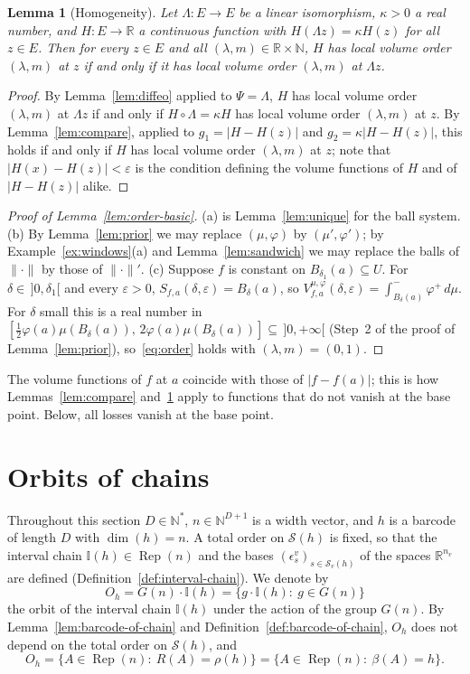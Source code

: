 \documentclass[11pt,a4paper]{article}
\newtheorem{lemma}[theorem]{Lemma}
\theoremstyle{definition}
\theoremstyle{remark}
\numberwithin{equation}{section}
\newcommand{\N}{\mathbb{N}}
\newcommand{\R}{\mathbb{R}}
\newcommand{\Rep}{\operatorname{Rep}}
\newcommand{\norm}[1]{\lVert #1\rVert}
\newcommand{\abs}[1]{\lvert #1\rvert}
\newcommand{\eps}{\varepsilon}
\newcommand{\I}{\mathbb I}
\newcommand{\Sl}{\mathcal S}
\begin{document}
\begin{lemma}[Homogeneity]\label{lem:homog-order}
Let $\Lambda:E\to E$ be a linear isomorphism, $\kappa>0$ a real number, and $H:E\to\R$ a continuous function with $H(\Lambda z)=\kappa H(z)$ for all $z\in E$. Then for every $z\in E$ and all $(\lambda,m)\in\R\times\N$, $H$ has local volume order $(\lambda,m)$ at $z$ if and only if it has local volume order $(\lambda,m)$ at $\Lambda z$.
\end{lemma}
\begin{proof}
By Lemma~\ref{lem:diffeo} applied to $\Psi=\Lambda$, $H$ has local volume order $(\lambda,m)$ at $\Lambda z$ if and only if $H\circ\Lambda=\kappa H$ has local volume order $(\lambda,m)$ at $z$. By Lemma~\ref{lem:compare}, applied to $g_1=\abs{H-H(z)}$ and $g_2=\kappa\abs{H-H(z)}$, this holds if and only if $H$ has local volume order $(\lambda,m)$ at $z$; note that $\abs{H(x)-H(z)}<\eps$ is the condition defining the volume functions of $H$ and of $\abs{H-H(z)}$ alike.
\end{proof}

\begin{proof}[Proof of Lemma~\ref{lem:order-basic}]
(a) is Lemma~\ref{lem:unique} for the ball system. (b) By Lemma~\ref{lem:prior} we may replace $(\mu,\varphi)$ by $(\mu',\varphi')$; by Example~\ref{ex:windows}(a) and Lemma~\ref{lem:sandwich} we may replace the balls of $\norm\cdot$ by those of $\norm\cdot'$. (c) Suppose $f$ is constant on $B_{\delta_1}(a)\subseteq U$. For $\delta\in\,]0,\delta_1[$ and every $\eps>0$, $S_{f,a}(\delta,\eps)=B_\delta(a)$, so $V^{\mu,\varphi}_{f,a}(\delta,\eps)=\int^-_{B_\delta(a)}\varphi^+\,d\mu$. For $\delta$ small this is a real number in $[\frac12\varphi(a)\mu(B_\delta(a)),\,2\varphi(a)\mu(B_\delta(a))]\subseteq\,]0,+\infty[$ (Step~2 of the proof of Lemma~\ref{lem:prior}), so~\eqref{eq:order} holds with $(\lambda,m)=(0,1)$.
\end{proof}

The volume functions of $f$ at $a$ coincide with those of $\abs{f-f(a)}$; this is how Lemmas~\ref{lem:compare} and~\ref{lem:homog-order} apply to functions that do not vanish at the base point. Below, all losses vanish at the base point.
\section{Orbits of chains}\label{sec:quiver}

Throughout this section $D\in\N^*$, $n\in\N^{D+1}$ is a width vector, and $h$ is a barcode of length $D$ with $\dim(h)=n$. A total order on $\Sl(h)$ is fixed, so that the interval chain $\I(h)\in\Rep(n)$ and the bases $(\epsilon^v_s)_{s\in\Sl_v(h)}$ of the spaces $\R^{n_v}$ are defined (Definition~\ref{def:interval-chain}). We denote by
\[
O_h=G(n)\cdot\I(h)=\{g\cdot\I(h):\ g\in G(n)\}
\]
the orbit of the interval chain $\I(h)$ under the action of the group $G(n)$. By Lemma~\ref{lem:barcode-of-chain} and Definition~\ref{def:barcode-of-chain}, $O_h$ does not depend on the total order on $\Sl(h)$, and
\begin{equation}\label{eq:orbit-ranks}
O_h=\{A\in\Rep(n):\ R(A)=\rho(h)\}=\{A\in\Rep(n):\ \beta(A)=h\}.
\end{equation}
\end{document}
